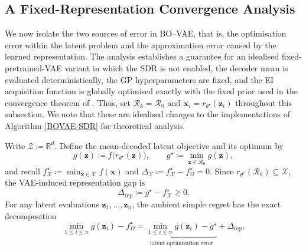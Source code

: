 \documentclass[pdflatex,sn-mathphys-num]{sn-jnl}%
\theoremstyle{thmstyleone}%
\theoremstyle{thmstyletwo}%
\theoremstyle{thmstylethree}%
\begin{document}
\subsection{A Fixed-Representation Convergence Analysis}
\label{sec:fixed-representation-theory}

We now isolate the two sources of error in BO--VAE, that is, the optimisation error within the latent problem and the approximation error caused by the learned representation.  The analysis establishes a guarantee for an idealised fixed-pretrained-VAE variant in which the SDR is not enabled, the decoder mean is evaluated deterministically, the GP hyperparameters are fixed, and the EI acquisition function is globally optimised exactly with the fixed prior used in the convergence theorem of \cite{bull2011ego}.  Thus, set $\mathcal{R}_k=\mathcal{R}_0$ and $\mathbf{x}_i=r_{\theta^\star}(\mathbf{z}_i)$ throughout this subsection.  We note that these are idealised changes to the implementations of Algorithm \ref{BOVAE-SDR} for theoretical analysis. 

Write $\mathcal{Z} \coloneq \mathbb{R}^d$.  Define the mean-decoded latent objective and its optimum by
\begin{equation}
  g(\mathbf{z}) \coloneq f\bigl(r_{\theta^\star}(\mathbf{z})\bigr),
  \qquad
  g^\star \coloneq \min_{\mathbf{z}\in\mathcal{R}_0}g(\mathbf{z}),
  \label{eq:fixed-latent-objective}
\end{equation}
and recall $f_{\mathcal{X}}^\star \coloneq \min_{\mathbf{x}\in\mathcal{X}}f(\mathbf{x})$ and $\Delta_{\mathcal{X}} \coloneq f_{\mathcal{X}}^\star-f_\Omega^\star = 0$. Since $r_{\theta^\star}(\mathcal{R}_0)\subseteq\mathcal{X}$, the VAE-induced representation gap is
\begin{equation}
  \Delta_{\mathrm{rep}}
   \coloneq g^\star-f_{\mathcal{X}}^\star\geq 0.
  \label{eq:fixed-representation-gap}
\end{equation}
For any latent evaluations $\mathbf{z}_1,\ldots,\mathbf{z}_n$, the ambient simple regret has the exact decomposition
\begin{equation}
  \min_{1\leq i\leq n}g(\mathbf{z}_i)-f_\Omega^\star
  =
  \underbrace{\min_{1\leq i\leq n}g(\mathbf{z}_i)-g^\star}_{\text{latent optimization error}}
  +\Delta_{\mathrm{rep}}.
  \label{eq:fixed-regret-decomposition}
\end{equation}
\end{document}
